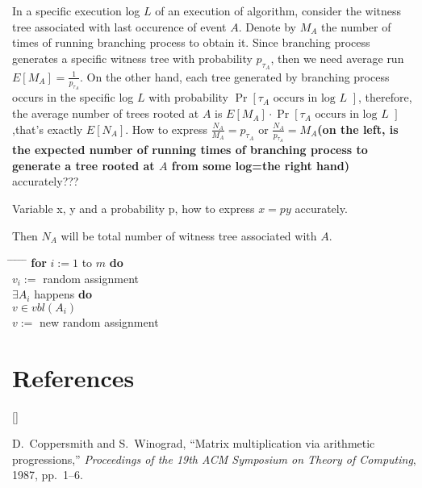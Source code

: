 \documentclass[twoside]{article}
\def\beginrefs{\begin{list}%
        {[\arabic{equation}]}{\usecounter{equation}
         \setlength{\leftmargin}{2.0truecm}\setlength{\labelsep}{0.4truecm}%
         \setlength{\labelwidth}{1.6truecm}}}
\def\endrefs{\end{list}}
\def\bibentry#1{\item[\hbox{[#1]}]}
\begin{document}
In a specific execution log $L$ of an execution of algorithm, consider the witness tree associated with last occurence of event $A$.  Denote by $M_A$ the number of times of running branching process to obtain it. Since branching process generates a specific witness tree with probability $p_{\tau_A}$, then we need average run $E[M_A]=\frac{1}{p_{\tau_A}}$. On the other hand, each tree generated by branching process occurs in the specific log $L$ with probability $\Pr[\tau_A\mbox{~occurs in log $L$~}]$, therefore, the average number of trees rooted at $A$ is $E[M_A]\cdot\Pr[\tau_A\mbox{~occurs in log $L$~}]$,that's exactly $E[N_A]$.   How to express $\frac{N_A}{M_A}=p_{\tau_A}$ or \textbf{$\frac{N_A}{p_{\tau_A}}=M_A$(on the left, is the expected number of running times of branching process to generate a tree rooted at $A$ from some log=the right hand)} accurately???

Variable x, y and a probability p, how to express $x=py$ accurately.

Then $N_A$ will be total number of witness tree associated with $A$.

\begin{tabbing}
\hspace*{.25in} \= \hspace*{.25in} \= \hspace*{.25in} \= \hspace*{.25in} \= \hspace*{.25in} \=\kill
\> {\bf for} $i:=1$ to $m$ {\bf do} \\
\>\>$v_i:=$ random assignment\\
 $\exists A_i$ happens {\bf do } \\
\> $v\in vbl(A_i)$ \\
\>\>\> $v:=$ new random assignment\\
\end{tabbing}


\section*{References}
\beginrefs
\bibentry{CW87}{\sc D.~Coppersmith} and {\sc S.~Winograd},
``Matrix multiplication via arithmetic progressions,''
{\it Proceedings of the 19th ACM Symposium on Theory of Computing},
1987, pp.~1--6.
\endrefs
\end{document}

